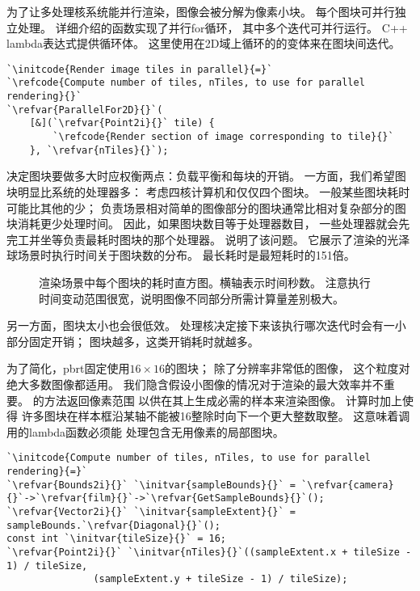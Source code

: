 为了让多处理核系统能并行渲染，图像会被分解为像素小块。
每个图块可并行独立处理。
详细介绍的函数实现了并行{\ttfamily for}循环，
其中多个迭代可并行运行。
C++ lambda表达式提供循环体。
这里使用在2D域上循环的的变体来在图块间迭代。
\begin{lstlisting}
`\initcode{Render image tiles in parallel}{=}`
`\refcode{Compute number of tiles, nTiles, to use for parallel rendering}{}`
`\refvar{ParallelFor2D}{}`(
    [&](`\refvar{Point2i}{}` tile) {
        `\refcode{Render section of image corresponding to tile}{}`
    }, `\refvar{nTiles}{}`);
\end{lstlisting}

决定图块要做多大时应权衡两点：负载平衡和每块的开销。
一方面，我们希望图块明显比系统的处理器多：
考虑四核计算机和仅仅四个图块。
一般某些图块耗时可能比其他的少；
负责场景相对简单的图像部分的图块通常比相对复杂部分的图块消耗更少处理时间。
因此，如果图块数目等于处理器数目，
一些处理器就会先完工并坐等负责最耗时图块的那个处理器。
说明了该问题。
它展示了渲染的光泽球场景时执行时间关于图块数的分布。
最长耗时是最短耗时的151倍。
\begin{figure}[htbp]
    \centering
    \caption{渲染\protect{}场景中每个图块的耗时直方图。横轴表示时间秒数。
        注意执行时间变动范围很宽，说明图像不同部分所需计算量差别极大。}
    \label{fig:1.18}
\end{figure}

另一方面，图块太小也会很低效。
处理核决定接下来该执行哪次迭代时会有一小部分固定开销；
图块越多，这类开销耗时就越多。

为了简化，pbrt固定使用$16\times16$的图块；
除了分辨率非常低的图像，
这个粒度对绝大多数图像都适用。
我们隐含假设小图像的情况对于渲染的最大效率并不重要。
的方法返回像素范围
以供在其上生成必需的样本来渲染图像。
计算时加上使得
许多图块在样本框沿某轴不能被16整除时向下一个更大整数取整。
这意味着调用的lambda函数必须能
处理包含无用像素的局部图块。
\begin{lstlisting}
`\initcode{Compute number of tiles, nTiles, to use for parallel rendering}{=}`
`\refvar{Bounds2i}{}` `\initvar{sampleBounds}{}` = `\refvar{camera}{}`->`\refvar{film}{}`->`\refvar{GetSampleBounds}{}`();
`\refvar{Vector2i}{}` `\initvar{sampleExtent}{}` = sampleBounds.`\refvar{Diagonal}{}`();
const int `\initvar{tileSize}{}` = 16;
`\refvar{Point2i}{}` `\initvar{nTiles}{}`((sampleExtent.x + tileSize - 1) / tileSize,
               (sampleExtent.y + tileSize - 1) / tileSize);
\end{lstlisting}


